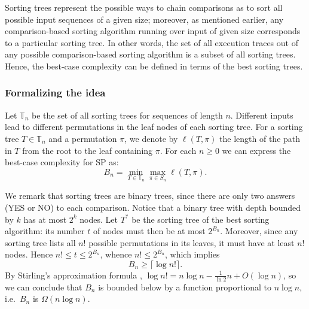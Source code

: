 \documentclass[a4paper]{book}
\theoremstyle{changebreak}                %
\begin{document}
Sorting trees represent the possible ways to chain comparisons as to
sort all possible input sequences of a given size; moreover, as
mentioned earlier, any comparison-based sorting
algorithm running over input
of given size corresponds to a particular sorting
tree. In other words, the set
of all execution traces out of any possible comparison-based sorting
algorithm is a subset of all sorting trees. Hence, the best-case
complexity can be defined in terms of the best sorting trees.

\subsubsection{Formalizing the idea}
\label{s:sorting:complexity:best}
Let $\mathbb{T}_n$ be the set of all sorting trees for
sequences of length $n$. Different inputs lead to
different permutations in the leaf nodes of each
sorting tree. For a sorting tree
$T\in\mathbb{T}_n$ and a permutation $\pi$, we denote by $\ell(T,\pi)$
the length of the path in $T$ from the root to
the leaf containing $\pi$.
For each $n\ge 0$ we can express the best-case complexity for SP
as:
\begin{equation*}
  B_n = \min_{T\in\mathbb{T}_n} \max_{\pi\in S_n} \ell(T,\pi).
\end{equation*}

We remark that sorting trees are binary trees,
since there are only two answers (YES or NO) to each
comparison. Notice that a binary tree with
depth bounded by $k$ has at most $2^k$
nodes. Let $T^\ast$ be the sorting tree of the best
sorting algorithm: its number $t$ of
nodes must then be at most $2^{B_n}$. Moreover, since any sorting
tree lists all $n!$ possible
permutations in its leaves, it must have at least
$n!$ nodes. Hence $n!\le t\le 2^{B_n}$, whence $n!\le 2^{B_n}$, which
implies
\begin{equation*}
  B_n\ge \lceil \log n!\rceil.
\end{equation*}
By Stirling's approximation
formula \cite{cameron2}, $\log n!=n\log
n-\frac{1}{\ln 2}n+O(\log n)$, so we can conclude that $B_n$ is
bounded below by a function proportional to $n\log n$, i.e.~$B_n$ is
$\Omega(n\log n)$.
\end{document}
